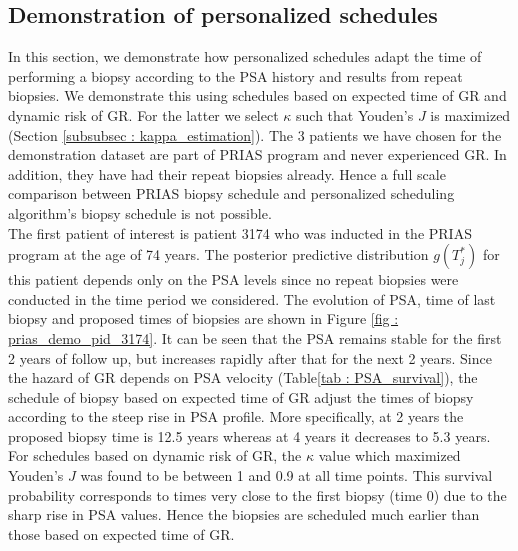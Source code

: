 \subsection{Demonstration of personalized schedules}
\label{subsec : demo_prias_pers_schedule}
In this section, we demonstrate how personalized schedules adapt the time of performing a biopsy according to the PSA history and results from repeat biopsies. We demonstrate this using schedules based on expected time of GR and dynamic risk of GR. For the latter we select $\kappa$ such that Youden's $J$ is maximized (Section \ref{subsubsec : kappa_estimation}). The 3 patients we have chosen for the demonstration dataset are part of PRIAS program and never experienced GR. In addition, they have had their repeat biopsies already. Hence a full scale comparison between PRIAS biopsy schedule and personalized scheduling algorithm's biopsy schedule is not possible.\\

The first patient of interest is patient 3174 who was inducted in the PRIAS program at the age of 74 years. The posterior predictive distribution $g(T^*_j)$ for this patient depends only on the PSA levels since no repeat biopsies were conducted in the time period we considered. The evolution of PSA, time of last biopsy and proposed times of biopsies are shown in Figure \ref{fig : prias_demo_pid_3174}. It can be seen that the PSA remains stable for the first 2 years of follow up, but increases rapidly after that for the next 2 years. Since the hazard of GR depends on PSA velocity (Table\ref{tab : PSA_survival}), the schedule of biopsy based on expected time of GR adjust the times of biopsy according to the steep rise in PSA profile. More specifically, at 2 years the proposed biopsy time is 12.5 years whereas at 4 years it decreases to 5.3 years. For schedules based on dynamic risk of GR, the $\kappa$ value which maximized Youden's $J$ was found to be between 1 and 0.9 at all time points. This survival probability corresponds to times very close to the first biopsy (time 0) due to the sharp rise in PSA values. Hence the biopsies are scheduled much earlier than those based on expected time of GR.\\

